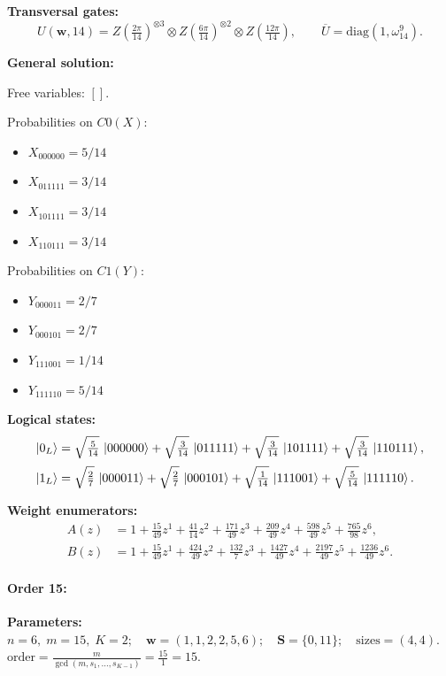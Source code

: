 \documentclass[11pt]{article}
\begin{document}
\noindent\textbf{Transversal gates:}
\[
    U(\mathbf w,14)=Z \left(\tfrac{2\pi}{14}\right)^{\otimes3} \otimes Z \left(\tfrac{6\pi}{14}\right)^{\otimes2} \otimes Z \left(\tfrac{12\pi}{14}\right),\qquad
    \overline U=\mathrm{diag}(1,\omega_{14}^{9}).
\]

\noindent\textbf{General solution:}

Free variables: $[]$.

Probabilities on $C0 (X)$:
\begin{itemize}
    \item $X_{000000} = 5/14$
    \item $X_{011111} = 3/14$
    \item $X_{101111} = 3/14$
    \item $X_{110111} = 3/14$
\end{itemize}

Probabilities on $C1 (Y)$:
\begin{itemize}
    \item $Y_{000011} = 2/7$
    \item $Y_{000101} = 2/7$
    \item $Y_{111001} = 1/14$
    \item $Y_{111110} = 5/14$
\end{itemize}

\noindent\textbf{Logical states:}
\begin{align*}
\ket{0_L} &= \sqrt{\tfrac{5}{14}}\,\ket{000000} + \sqrt{\tfrac{3}{14}}\,\ket{011111} + \sqrt{\tfrac{3}{14}}\,\ket{101111} + \sqrt{\tfrac{3}{14}}\,\ket{110111},
\\[2pt]
\ket{1_L} &= \sqrt{\tfrac{2}{7}}\,\ket{000011} + \sqrt{\tfrac{2}{7}}\,\ket{000101} + \sqrt{\tfrac{1}{14}}\,\ket{111001} + \sqrt{\tfrac{5}{14}}\,\ket{111110}.
\end{align*}

\noindent\textbf{Weight enumerators:}
\begin{align*}
A(z) &= 1 + \tfrac{15}{49}z^{1} + \tfrac{41}{14}z^{2} + \tfrac{171}{49}z^{3} + \tfrac{209}{49}z^{4} + \tfrac{598}{49}z^{5} + \tfrac{765}{98}z^{6},\\[2pt]
B(z) &= 1 + \tfrac{15}{49}z^{1} + \tfrac{424}{49}z^{2} + \tfrac{132}{7}z^{3} + \tfrac{1427}{49}z^{4} + \tfrac{2197}{49}z^{5} + \tfrac{1236}{49}z^{6}.
\end{align*}

\paragraph{\textbf{Order 15:}}
\noindent\textbf{Parameters:} $n=6,\; m=15,\; K=2;\quad \mathbf w=(1, 1, 2, 2, 5, 6);\quad \mathbf S=\{0, 11\};\quad \text{sizes}=\left(4, 4\right).$ $\displaystyle \text{order}=\frac{m}{\gcd(m,s_1,\dots,s_{K-1})}=\frac{15}{1}=15.$
\end{document}
